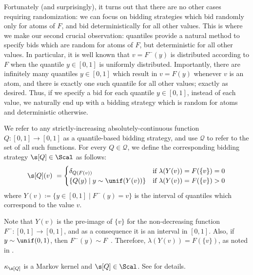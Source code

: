Fortunately (and surprisingly), it turns out that there are no other cases requiring randomization: we can focus on bidding strategies which bid randomly only for atoms of $F$, and bid deterministically for all other values. This is where we make our second crucial observation: quantiles provide a natural method to specify bids which are random for atoms of $F$, but deterministic for all other values. In particular, it is well known that $v = F^-(y)$ is distributed according to $F$ when the quantile $y \in [0,1]$ is uniformly distributed. Importantly, there are infinitely many quantiles $y \in [0,1]$ which result in $v = F(y)$ whenever $v$ is an atom, and there is exactly one such quantile for all other values; exactly as desired. Thus, if we specify a bid for each quantile $y \in [0,1]$, instead of each value, we naturally end up with a bidding strategy which is random for atoms and deterministic otherwise.

\begin{definition}\label{def:quantile-based-bidding-strategy}
	We refer to any strictly-increasing absolutely-continuous function ${Q: [0,1] \to [0,1]}$ as a quantile-based bidding strategy, and use $\mathcal Q$ to refer to the set of all such functions. For every $Q \in \mathcal Q$, we define the corresponding bidding strategy $\s[Q] \in \Scal$ as follows:
	\begin{align*}
		\s[Q](v)\ = \begin{cases}
			\delta_{Q(F(v))} &\text{if } \lambda(Y(v)) = F(\{v\}) = 0\\
			\{Q(y)\mid y \sim \unif(Y(v))\} &\text{if } \lambda(Y(v)) = F(\{v\}) >  0
		\end{cases}
	\end{align*}
	where $Y(v) \coloneqq \{y \in [0,1] \mid F^-(y) = v\}$ is the interval of quantiles which correspond to the value $v$.
\end{definition}

\begin{remark}\label{remark:Y-interval}
	Note that $Y(v)$ is the pre-image of $\{v\}$ for the non-decreasing function ${F^-: [0,1] \to [0,1]}$, and as a consequence it is an interval in $[0,1]$. Also, if $y \sim \unif(0,1)$, then $F^-(y) \sim F$~\citep{embrechts2013note}. Therefore, $\lambda(Y(v)) = F(\{v\})$, as noted in .
\end{remark}

\begin{remark}\label{remark:kernel}
	$\kappa_{\s[Q]}$ is a Markov kernel and $\s[Q] \in \Scal$. See  for details. 
\end{remark}


